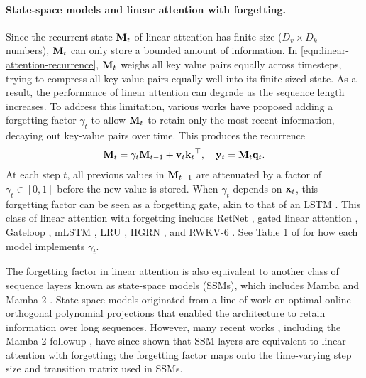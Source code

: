 \documentclass[notitlepage, 11pt]{article}
\newcommand*{\dkey}{{D_k}}
\newcommand*{\dval}{{D_v}}
\begin{document}
\paragraph{State-space models and linear attention with forgetting.}
Since the recurrent state $\mathbf{M}_t$ of linear attention has finite size ($\dval\times\dkey$ numbers), $\mathbf{M}_t$ can only store a bounded amount of information.
In \autoref{eqn:linear-attention-recurrence}, $\mathbf{M}_t$ weighs all key value pairs equally across timesteps, trying to compress all key-value pairs equally well into its finite-sized state.
As a result, the performance of linear attention can degrade as the sequence length increases.
To address this limitation, various works have proposed adding a forgetting factor $\gamma_t$ to allow $\mathbf{M}_t$ to retain only the most recent information, decaying out key-value pairs over time.
This produces the recurrence
\begin{align}
    \mathbf{M}_t = \gamma_t \mathbf{M}_{t-1} + \mathbf{v}_t\mathbf{k}_t{}^\top, \quad \mathbf{y}_t = \mathbf{M}_t \mathbf{q}_t. \label{eqn:gated-linear-attention-recurrence}
\end{align}
At each step $t$, all previous values in $\mathbf{M}_{t-1}$ are attenuated by a factor of $\gamma_t\in[0, 1]$ before the new value is stored.
When $\gamma_t$ depends on $\mathbf{x}_t$, this forgetting factor can be seen as a forgetting gate, akin to that of an LSTM \citep{Hochreiter1997LongShortTermMemory}.
This class of linear attention with forgetting includes RetNet \citep{Sun2023RetentiveNetworkSuccessor}, gated linear attention \citep{Yang2024GatedLinearAttention}, Gateloop \citep{Katsch2024GateLoopFullyDataControlled}, mLSTM \citep{Beck2024XLSTMExtendedLong}, LRU \citep{Orvieto2023ResurrectingRecurrentNeural}, HGRN \citep{Qin2024HGRN2GatedLinear}, and RWKV-6 \citep{Peng2024EagleFinchRWKV}.
See Table 1 of \citet{Yang2024GatedLinearAttention} for how each model implements $\gamma_t$.

The forgetting factor in linear attention is also equivalent to another class of sequence layers known as state-space models (SSMs), which includes Mamba \citep{Gu2024MambaLinearTimeSequence} and Mamba-2 \citep{Dao2024TransformersAreSSMs}.
State-space models originated from a line of work on optimal online orthogonal polynomial projections \citep{Gu2020HiPPORecurrentMemory,Gu2021EfficientlyModelingLong,Gu2022ParameterizationInitializationDiagonal} that enabled the architecture to retain information over long sequences.
However, many recent works \citep{Han2024DemystifyMambaVision,Trockman2024MimeticInitializationHelps,Ren2024CanMambaAlways}, including the Mamba-2 followup \citep{Dao2024TransformersAreSSMs}, have since shown that SSM layers are equivalent to linear attention with forgetting; the forgetting factor maps onto the time-varying step size and transition matrix used in SSMs.
\end{document}
